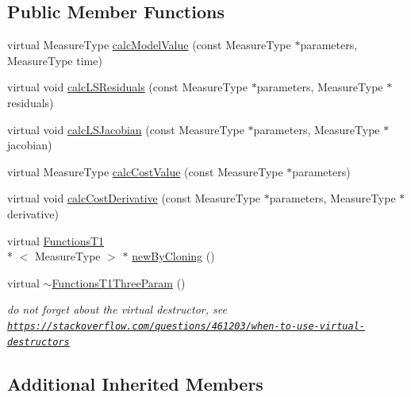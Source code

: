 \subsection*{Public Member Functions}
\begin{DoxyCompactItemize}
\item 
virtual Measure\-Type \hyperlink{class_ox_1_1_functions_t1_three_param_a48242f25fc60e274e0e11addb58d626a}{calc\-Model\-Value} (const Measure\-Type $\ast$parameters, Measure\-Type time)
\item 
virtual void \hyperlink{class_ox_1_1_functions_t1_three_param_a95dfd4c0371eb5564e561a779d058508}{calc\-L\-S\-Residuals} (const Measure\-Type $\ast$parameters, Measure\-Type $\ast$residuals)
\item 
virtual void \hyperlink{class_ox_1_1_functions_t1_three_param_a9fa0294a6d85a89fae6d3ce3f8aa0e9f}{calc\-L\-S\-Jacobian} (const Measure\-Type $\ast$parameters, Measure\-Type $\ast$jacobian)
\item 
virtual Measure\-Type \hyperlink{class_ox_1_1_functions_t1_three_param_acbb85b9dbfacf0d13a0965add99c5965}{calc\-Cost\-Value} (const Measure\-Type $\ast$parameters)
\item 
virtual void \hyperlink{class_ox_1_1_functions_t1_three_param_a94cf9dbac05d42e3f554fc98dc6b188a}{calc\-Cost\-Derivative} (const Measure\-Type $\ast$parameters, Measure\-Type $\ast$derivative)
\item 
virtual \hyperlink{class_ox_1_1_functions_t1}{Functions\-T1}\\*
$<$ Measure\-Type $>$ $\ast$ \hyperlink{class_ox_1_1_functions_t1_three_param_ab4a91ffbef69e36dc0b521c149f95481}{new\-By\-Cloning} ()
\item 
\hypertarget{class_ox_1_1_functions_t1_three_param_aa810edf6c468d0e544e69d7b3123b443}{virtual \hyperlink{class_ox_1_1_functions_t1_three_param_aa810edf6c468d0e544e69d7b3123b443}{$\sim$\-Functions\-T1\-Three\-Param} ()}\label{class_ox_1_1_functions_t1_three_param_aa810edf6c468d0e544e69d7b3123b443}

\begin{DoxyCompactList}\small\item\em do not forget about the virtual destructor, see \href{https://stackoverflow.com/questions/461203/when-to-use-virtual-destructors}{\tt https\-://stackoverflow.\-com/questions/461203/when-\/to-\/use-\/virtual-\/destructors} \end{DoxyCompactList}\end{DoxyCompactItemize}
\subsection*{Additional Inherited Members}


